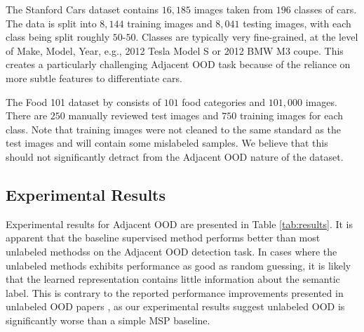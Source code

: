 \documentclass{article} %
\theoremstyle{plain}
\theoremstyle{definition}
\theoremstyle{remark}
\begin{document}
The Stanford Cars dataset \citep{KrauseStarkDengFei-Fei_3DRR2013} contains $16,185$ images taken from $196$ classes of cars. The data is split into $8,144$ training images and $8,041$ testing images, with each class being split roughly $50$-$50$. Classes are typically very fine-grained, at the level of Make, Model, Year, e.g., 2012 Tesla Model S or 2012 BMW M3 coupe. This creates a particularly challenging Adjacent OOD task because of the reliance on more subtle features to differentiate cars. 


The Food 101 dataset by \citep{bossard14} consists of $101$ food categories and $101,000$ images. There are $250$ manually reviewed test images and $750$ training images for each class. Note that training images were not cleaned to the same standard as the test images and will contain some mislabeled samples. We believe that this should not significantly detract from the Adjacent OOD nature of the dataset.




\vspace{-2mm}\subsection{Experimental Results}\vspace{-2mm}

Experimental results for Adjacent OOD are presented in Table \ref{tab:results}. It is apparent that the baseline supervised method performs better than most unlabeled methodss on the Adjacent OOD detection task. In cases where the unlabeled methods exhibits performance as good as random guessing, it is likely that the learned representation contains little information about the semantic label. This is contrary to the reported performance improvements presented in unlabeled OOD papers \citep{sehwag2021ssd, hendrycks2019using, liu2023unsupervised}, as our experimental results suggest unlabeled OOD is significantly worse than a simple MSP baseline.
\end{document}
